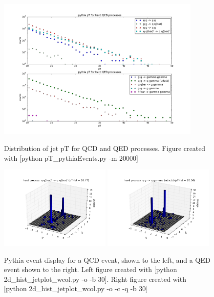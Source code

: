 \documentclass[11pt]{article}
\begin{document}
\begin{figure}[h]
\begin{center}
\includegraphics[width=0.9\textwidth]{pT_pythiaEvents.pdf}
\label{fig_label}
\caption{Distribution of jet pT for QCD and QED processes.  Figure created with [python pT\_pythiaEvents.py -m 20000]}
\end{center}
\end{figure}

\begin{figure}[h]
\begin{center}
\includegraphics[width=0.49\textwidth]{2d_hist_jetplot.png}
\includegraphics[width=0.49\textwidth]{2d_hist_jetplot2.png}
\label{fig_label}
\caption{Pythia event display for a QCD event, shown to the left, and a QED event shown to the right.  Left figure created with [python 2d\_hist\_jetplot\_wcol.py -o -b 30]. Right figure created with [python 2d\_hist\_jetplot\_wcol.py -o -c -q -b 30]}
\end{center}
\end{figure}
\end{document}
